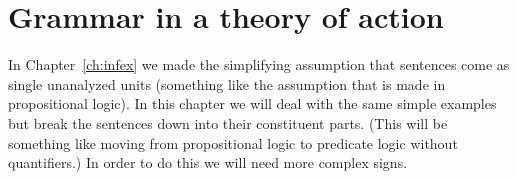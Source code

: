 \chapter{Grammar in a theory of action}
\label{ch:gram}
\setcounter{equation}{0}


In Chapter~\ref{ch:infex} we made the simplifying assumption that
sentences come as single unanalyzed units (something like the
assumption that is made in propositional logic).  In this chapter we
will deal with the same simple examples but break the sentences down
into their constituent parts.  (This will be something like moving
from propositional logic to predicate logic without quantifiers.)
In order to do this we will need more complex signs.  

